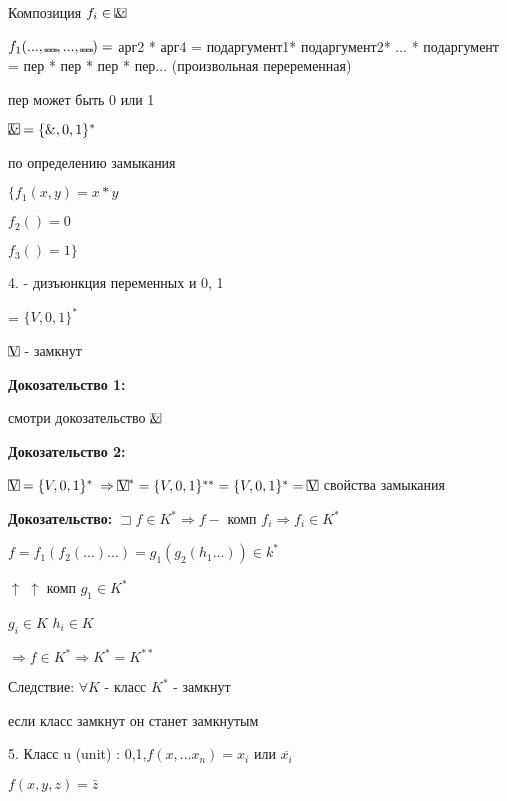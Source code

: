 \documentclass[russian]{lecture-notes}
\begin{document}
\begin{example}
		Композиция $f_{i} \in \frame{\&}$

		$f_1(...,\frame{...},...,\frame{...}) = $ арг2 * арг4 = подаргумент1* подаргумент2* ... * подаргумент =
		пер * пер * пер * пер... (произвольная переременная)

		пер может быть 0 или 1

		\begin{proposition}
			$\frame{\&} = \{\&,0,1\}^{*}$

			по определению замыкания

			$\{f_{1}(x,y) = x*y$

			$f_{2}() = 0$

			$f_{3}() = 1\}$

			\end{proposition}

		4.  - дизъюнкция переменных и 0, 1

		 = $\{V,0,1\}^{*}$

		\begin{proposition}

			$\frame{V} $ - замкнут

			\end{proposition}

		\textbf{Докозательство 1: }

		смотри докозательство $\frame{\&}$


		\textbf{Докозательство 2: }

		$\frame{V} = \{V,0,1\}^{*}$ 
		$\Rightarrow \frame{V}^{*} = \{V,0,1\}^{**} = \{V,0,1\}^{*} = \frame{V}$ свойства замыкания

		\end{example}

	\textbf{Докозательство: } $\sqsupset  f \in K^{*} \Rightarrow f - $ комп $f_{i}
	\Rightarrow f_{i} \in K^{*}
	$

	$ f = f_{1} (f_2(...)...) = g_{1}(g_{2}(h_{1}...)) \in k^{*}
	$

	\qquad $\uparrow$ \quad $\uparrow$ \qquad комп $g_{1} \in K^{*}$

	$g_{i} \in K $ $h_{i} \in K$

	$\Rightarrow f \in K^{*} \Rightarrow K^{*} = K^{**}$

	Следствие: $\forall K$ - класс $K^{*}$ - замкнут

	если класс замкнут он станет замкнутым

	5. Класс u (unit) : 0,1,$f(x,...x_{n}) = x_{i}$ или  $\overline{x_{i}}$

	$f(x,y,z) = \bar{z}$
\end{document}
